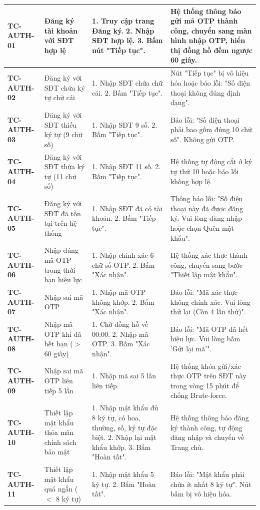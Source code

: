 {\begin{longtable}{p{2.3cm}p{3.8cm}p{4.8cm}p{4.2cm}}
\textbf{TC-AUTH-01} & Đăng ký tài khoản với SĐT hợp lệ & 1. Truy cập trang Đăng ký. 2. Nhập SĐT hợp lệ. 3. Bấm nút "Tiếp tục". & Hệ thống thông báo gửi mã OTP thành công, chuyển sang màn hình nhập OTP, hiển thị đồng hồ đếm ngược 60 giây. \\ \midrule
\textbf{TC-AUTH-02} & Đăng ký với SĐT chứa ký tự chữ cái & 1. Nhập SĐT chứa chữ cái. 2. Bấm "Tiếp tục". & Nút "Tiếp tục" bị vô hiệu hóa hoặc báo lỗi: "Số điện thoại không đúng định dạng". \\ \midrule
\textbf{TC-AUTH-03} & Đăng ký với SĐT thiếu ký tự (9 chữ số) & 1. Nhập SĐT 9 số. 2. Bấm "Tiếp tục". & Báo lỗi: "Số điện thoại phải bao gồm đúng 10 chữ số". Không gửi OTP. \\ \midrule
\textbf{TC-AUTH-04} & Đăng ký với SĐT thừa ký tự (11 chữ số) & 1. Nhập SĐT 11 số. 2. Bấm "Tiếp tục". & Hệ thống tự động cắt ở ký tự thứ 10 hoặc báo lỗi không hợp lệ. \\ \midrule
\textbf{TC-AUTH-05} & Đăng ký với SĐT đã tồn tại trên hệ thống & 1. Nhập SĐT đã có tài khoản. 2. Bấm "Tiếp tục". & Thông báo lỗi: "Số điện thoại này đã được đăng ký. Vui lòng đăng nhập hoặc chọn Quên mật khẩu". \\ \midrule
\textbf{TC-AUTH-06} & Nhập đúng mã OTP trong thời hạn hiệu lực & 1. Nhập chính xác 6 chữ số OTP. 2. Bấm "Xác nhận". & Hệ thống xác thực thành công, chuyển sang bước "Thiết lập mật khẩu". \\ \midrule
\textbf{TC-AUTH-07} & Nhập sai mã OTP & 1. Nhập mã OTP không khớp. 2. Bấm "Xác nhận". & Báo lỗi: "Mã xác thực không chính xác. Vui lòng thử lại (Còn 4 lần thử)". \\ \midrule
\textbf{TC-AUTH-08} & Nhập mã OTP khi đã hết hạn ($>$60 giây) & 1. Chờ đồng hồ về 00:00. 2. Nhập mã OTP. 3. Bấm "Xác nhận". & Báo lỗi: "Mã OTP đã hết hiệu lực. Vui lòng bấm 'Gửi lại mã'". \\ \midrule
\textbf{TC-AUTH-09} & Nhập sai mã OTP liên tiếp 5 lần & 1. Nhập mã sai 5 lần liên tiếp. & Hệ thống khóa gửi/xác thực OTP trên SĐT này trong vòng 15 phút để chống Brute-force. \\ \midrule
\textbf{TC-AUTH-10} & Thiết lập mật khẩu thỏa mãn chính sách bảo mật & 1. Nhập mật khẩu đủ 8 ký tự, có hoa, thường, số, ký tự đặc biệt. 2. Nhập lại mật khẩu khớp. 3. Bấm "Hoàn tất". & Hệ thống thông báo đăng ký thành công, tự động đăng nhập và chuyển về Trang chủ. \\ \midrule
\textbf{TC-AUTH-11} & Thiết lập mật khẩu quá ngắn ($<$ 8 ký tự) & 1. Nhập mật khẩu 5 ký tự. 2. Bấm "Hoàn tất". & Báo lỗi: "Mật khẩu phải chứa ít nhất 8 ký tự". Nút bấm bị vô hiệu hóa. \\ \midrule

\end{longtable}}
